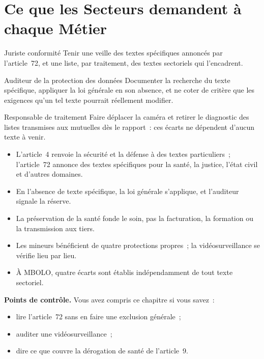 \section{Ce que les Secteurs demandent à chaque Métier}
\label{sec:c15-metiers}

\begin{boxmetier}{Juriste conformité}
Tenir une veille des textes spécifiques annoncés par l'article~72, et une
liste, par traitement, des textes sectoriels qui l'encadrent.
\end{boxmetier}

\begin{boxmetier}{Auditeur de la protection des données}
Documenter la recherche du texte spécifique, appliquer la loi générale en
son absence, et ne coter \NEK{} de critère que les exigences qu'un tel
texte pourrait réellement modifier.
\end{boxmetier}

\begin{boxmetier}{Responsable de traitement}
Faire déplacer la caméra et retirer le diagnostic des listes transmises
aux mutuelles dès le rapport~: ces écarts ne dépendent d'aucun texte à
venir.
\end{boxmetier}

\begin{boxresume}
\begin{itemize}
    \item L'article~4 renvoie la sécurité et la défense à des textes
          particuliers~; l'article~72 annonce des textes spécifiques pour la
          santé, la justice, l'état civil et d'autres domaines.
    \item En l'absence de texte spécifique, la loi générale s'applique, et
          l'auditeur signale la réserve.
    \item La préservation de la santé fonde le soin, pas la facturation, la
          formation ou la transmission aux tiers.
    \item Les mineurs bénéficient de quatre protections propres~; la
          vidéosurveillance se vérifie lieu par lieu.
    \item À MBOLO, quatre écarts sont établis indépendamment de tout texte
          sectoriel.
\end{itemize}
\end{boxresume}

\begin{boxinfo}
\textbf{Points de contrôle.} Vous avez compris ce chapitre si vous savez~:
\begin{itemize}
    \item lire l'article~72 sans en faire une exclusion générale~;
    \item auditer une vidéosurveillance~;
    \item dire ce que couvre la dérogation de santé de l'article~9.
\end{itemize}
\end{boxinfo}

